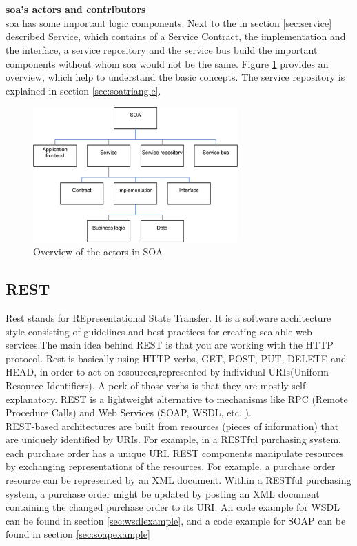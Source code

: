 \documentclass[12pt]{article}
\begin{document}
\\ \\\textbf{\gls{soa}'s actors and contributors}\\
\gls{soa} has some important logic components. Next to the in section \ref{sec:service} described Service, which contains of a Service Contract, the implementation and the interface, a service repository and the service bus build the important components without whom \gls{soa} would not be the same. Figure \ref{fig:actorsSoa} provides an overview, which help to understand the basic concepts. The service repository is explained in section \ref{sec:soatriangle}.
	\begin{figure}
	\centering
	\includegraphics[width=0.7\textwidth]{images/arg2}
	\caption{Overview of the actors in SOA \cite{arg2}}
	\label{fig:actorsSoa}
	\end{figure}
	\FloatBarrier
	\newpage
\subsection{REST}
Rest stands for REpresentational State Transfer. It is a software architecture style consisting of guidelines and best practices 
for creating scalable web services.The main idea behind REST is that you are working with the HTTP protocol. Rest is basically using HTTP verbs, GET, POST, PUT, DELETE and HEAD, in order to act on resources,represented by individual URIs(Uniform Resource Identifiers). 
A perk of those verbs is that they are mostly self-explanatory. REST is a lightweight alternative to mechanisms like RPC (Remote Procedure Calls) and Web Services (SOAP, WSDL, etc. ). \\
REST-based architectures are built from resources (pieces of information) that are uniquely identified by URIs. For example, in a RESTful purchasing system, each purchase order has a unique URI.
REST components manipulate resources by exchanging representations of the resources. For example, a purchase order resource can be represented by an XML document. Within a RESTful purchasing system, a purchase order might be updated by posting an XML document containing the changed purchase order to its URI.
An code example for WSDL can be found in section \ref{sec:wsdlexample}, 
and a code example for SOAP can be found in section \ref{sec:soapexample}
\end{document}

